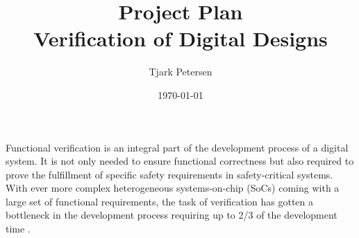 \documentclass[11pt]{article}
\begin{document}
\title{{\Huge Project Plan}\\ Verification of Digital Designs}
\author{Tjark Petersen}
\date{\today}

\maketitle


\begin{comment}
- verification important -> not only for functional correctness, but required for safety-critical systems
- in the critical path of the development process \cite{bergeron2012writing}
- consumes more than 2/3 of the development time \cite{bergeron2012writing}
- dedicated verification engineers
- intricate process, not any more just writing a testbench with some directed test cases
- complex environments, complex SoCs, random stimulus, coverage-driven verification, formal verification, etc.
- abstraction can help to manage complexity \cite{bergeron2012writing}
- but we have balance control and abstraction \cite{bergeron2012writing}



- HVLs were introduced to abstract and ease testbench development
- intially co-simulation based like Vera added crv, OOP, etc.
- today SV merged SuperLog and Vera -> single language

- SV alone provides primitives for creation of best practice test environments
- but no guidlines of how to do so -> no reuse
- UVM introduces framework for creation of sophisticated testbenches in SV which encourage reuse by providing guidelines and class hierarchies \cite{flake2020a}
- standard from 2017




- "all verification projects present a recurring set of challenges; hence, valuable time and effort are saved by reusing code common to all environments. This is achieved with a software library that provides verification facilities such as error reporting and communications handshaking" \cite{flake2020a}


\end{comment}

Functional verification is an integral part of the development process of a digital system. It is not only needed to ensure functional correctness but also required to prove the fulfillment of specific safety requirements in safety-critical systems. 
With ever more complex heterogeneous systems-on-chip (SoCs) coming with a large set of functional requirements, the task of verification has gotten a bottleneck in the development process requiring up to 2/3 of the development time \cite{bergeron2012writing}.
\end{document}
